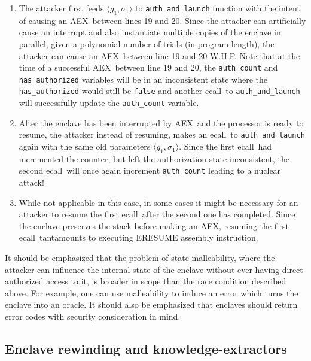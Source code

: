 \documentclass[letterpaper]{article}
\newcommand{\ecall}{\textsf{ecall}}
\newcommand{\aex}{\textsf{AEX}}
\begin{document}
  \begin{enumerate}
  \item The attacker first feeds $\langle g_1, \sigma_1 \rangle$ to
    \texttt{auth\_and\_launch} function with the intent of causing an
    \aex\ between lines 19 and 20. Since the attacker can artificially
    cause an interrupt and also instantiate multiple copies of the
    enclave in parallel, given a polynomial number of trials (in
    program length), the attacker can cause an \aex\ between line 19
    and 20 W.H.P. Note that at the time of a successful \aex\ between
    line 19 and 20, the \texttt{auth\_count} and
    \texttt{has\_authorized} variables will be in an inconsistent
    state where the \texttt{has\_authorized} would still be
    \texttt{false} and another \ecall\ to \texttt{auth\_and\_launch}
    will successfully update the \texttt{auth\_count} variable.

  \item After the enclave has been interrupted by \aex\ and the
    processor is ready to resume, the attacker instead of resuming,
    makes an \ecall\ to \texttt{auth\_and\_launch} again with the same
    old parameters $\langle g_1, \sigma_1 \rangle$. Since the first
    \ecall\ had incremented the counter, but left the authorization
    state inconsistent, the second \ecall\ will once again increment
    \texttt{auth\_count} leading to a nuclear attack!

  \item While not applicable in this case, in some cases it might be
    necessary for an attacker to resume the first \ecall\ after the
    second one has completed. Since the enclave preserves the stack
    before making an \aex, resuming the first \ecall\ tantamounts to
    executing \textsf{ERESUME} assembly instruction.

  \end{enumerate}

  It should be emphasized that the problem of state-malleability,
  where the attacker can influence the internal state of the enclave
  without ever having direct authorized access to it, is broader in
  scope than the race condition described above. For example, one can
  use malleability to induce an error which turns the enclave into an
  oracle. It should also be emphasized that enclaves should return
  error codes with security consideration in mind.

  \subsection{Enclave rewinding and knowledge-extractors}
  \label{ssec:rewind}
\end{document}
